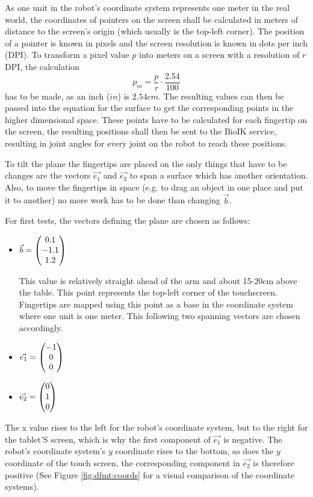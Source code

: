 As one unit in the robot's coordinate system represents one meter in the real world, the coordinates of pointers on the screen shall be calculated in meters of distance to the screen's origin (which usually is the top-left corner). The position of a pointer is known in pixels and the screen resolution is known in dots per inch (DPI). To transform a pixel value $p$ into meters on a screen with a resolution of $r$ DPI, the calculation
\begin{equation*}
p_m = \frac{p}{r} \cdot \frac{2.54}{100}
\end{equation*}
has to be made, as an inch ($in$) is $2.54cm$. The resulting values can then be passed into the equation for the surface to get the corresponding points in the higher dimensional space. These points have to be calculated for each fingertip on the screen, the resulting positions shall then be sent to the BioIK service, resulting in joint angles for every joint on the robot to reach these positions.

To tilt the plane the fingertips are placed on the only things that have to be changes are the vectors $\vec{e_1}$ and $\vec{e_2}$ to span a surface which has another orientation. Also, to move the fingertips in space (e.g. to drag an object in one place and put it to another) no more work has to be done than changing $\vec{b}$. 

For first tests, the vectors defining the plane are chosen as follows:
\begin{itemize}
	\item $\vec{b} = \left( \begin{matrix} 0.1 \\ -1.1 \\ 1.2 \end{matrix} \right)$
	
	This value is relatively straight ahead of the arm and about 15-20cm above the table. This point represents the top-left corner of the touchscreen. Fingertips are mapped using this point as a base in the coordinate system where one unit is one meter. This following two spanning vectors are chosen accordingly.
	\item $\vec{e_1} = \left( \begin{matrix} -1 \\ 0 \\ 0 \end{matrix} \right)$
	\item $\vec{e_2} = \left( \begin{matrix} 0 \\ 1 \\ 0 \end{matrix} \right)$
\end{itemize}

The x value rises to the left for the robot's coordinate system, but to the right for the tablet'S screen, which is why the first component of $\vec{e_1}$ is negative. The robot's coordinate system's $y$ coordinate rises to the bottom, so does the $y$ coordinate of the touch screen, the corresponding component in $\vec{e_2}$ is therefore positive (See Figure \ref{fig:dfmt:coords} for a visual comparison of the coordinate systems).

